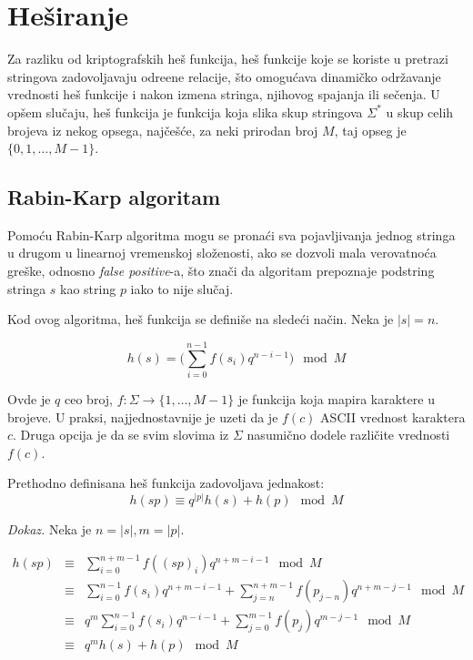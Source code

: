 \section{He\v siranje}

Za razliku od kriptografskih he\v s funkcija, he\v s funkcije koje se koriste u pretrazi stringova zadovoljavaju odre\dj ene relacije, \v sto omogu\' cava dinami\v cko odr\v zavanje vrednosti he\v s funkcije i nakon izmena stringa, njihovog spajanja ili se\v cenja. U op\v sem slu\v caju, he\v s funkcija je funkcija koja slika skup stringova $\Sigma^*$ u skup celih brojeva iz nekog opsega, naj\v ce\v s\' ce, za neki prirodan broj $M$, taj opseg je $\{0, 1, \ldots, M-1\}$.

\subsection{Rabin-Karp algoritam}

Pomo\' cu Rabin-Karp algoritma mogu se prona\' ci sva pojavljivanja jednog stringa u drugom u linearnoj vremenskoj slo\v zenosti, ako se dozvoli mala verovatno\' ca gre\v ske, odnosno \textit{false positive}-a, \v sto zna\v ci da algoritam prepoznaje podstring stringa $s$ kao string $p$ iako to nije slu\v caj.

Kod ovog algoritma, he\v s funkcija se defini\v se na slede\' ci na\v cin. Neka je $|s| = n$.

\begin{equation}
    h(s) = \Big(\sum_{i=0}^{n-1} f(s_i)q^{n-i-1}\Big) \mod M
\end{equation}

Ovde je $q$ ceo broj, $f : \Sigma \rightarrow \{1, \ldots, M-1\}$ je funkcija koja mapira karaktere u brojeve. U praksi, najjednostavnije je uzeti da je $f(c)$ ASCII vrednost karaktera $c$. Druga opcija je da se svim slovima iz $\Sigma$ nasumi\v cno dodele razli\v cite vrednosti $f(c)$.

\begin{thm}
Prethodno definisana he\v s funkcija zadovoljava jednakost:
\begin{equation}
\label{hashjednacina}
    h(sp) \equiv q^{|p|}h(s)+h(p) \mod M
\end{equation}
\end{thm}

\textit{Dokaz.} Neka je $n = |s|, m = |p|$.

\begin{align*}
     h(sp) & \equiv & \sum_{i=0}^{n+m-1} f((sp)_i)q^{n+m-i-1} \mod M \\
           & \equiv & \sum_{i=0}^{n-1} f(s_i)q^{n+m-i-1} + \sum_{j=n}^{n+m-1} f(p_{j-n})q^{n+m-j-1} \mod M \\
           & \equiv & q^m \sum_{i=0}^{n-1} f(s_i)q^{n-i-1} + \sum_{j=0}^{m-1} f(p_{j})q^{m-j-1} \mod M \\
           & \equiv & q^m h(s) + h(p) \mod M \\
\end{align*}

